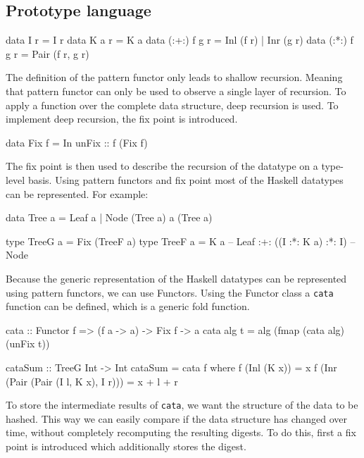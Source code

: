 \subsection{Prototype language}
\begin{haskell}
data I r         = I r                  
data K a r       = K a                  
data (:+:) f g r = Inl (f r) | Inr (g r)
data (:*:) f g r = Pair (f r, g r)
\end{haskell}

The definition of the pattern functor only leads to shallow recursion. Meaning that pattern functor can only be used to observe a single layer of recursion. To apply a function over the complete data structure, deep recursion is used. To implement deep recursion, the fix point is introduced.

\begin{haskell}
data Fix f = In { unFix :: f (Fix f) }
\end{haskell}

The fix point is then used to describe the recursion of the datatype on a type-level basis. Using pattern functors and fix point most of the Haskell datatypes can be represented. For example:

\begin{haskell}
data Tree a = Leaf a
            | Node (Tree a) a (Tree a)

type TreeG a = Fix (TreeF a)
type TreeF a = K a                  -- Leaf
            :+: ((I :*: K a) :*: I) -- Node
\end{haskell}

Because the generic representation of the Haskell datatypes can be represented using pattern functors, we can use Functors. Using the Functor class a \texttt{cata} function can be defined, which is a generic fold function.

\begin{haskell}
cata :: Functor f => (f a -> a) -> Fix f -> a
cata alg t = alg (fmap (cata alg) (unFix t))
\end{haskell}

\begin{haskell}
cataSum :: TreeG Int -> Int
cataSum = cata f
  where
    f (Inl (K x))                         = x
    f (Inr (Pair (Pair (I l, K x), I r))) = x + l + r
\end{haskell}

To store the intermediate results of \texttt{cata}, we want the structure of the data to be hashed. This way we can easily compare if the data structure has changed over time, without completely recomputing the resulting digests. To do this, first a fix point is introduced which additionally stores the digest.

